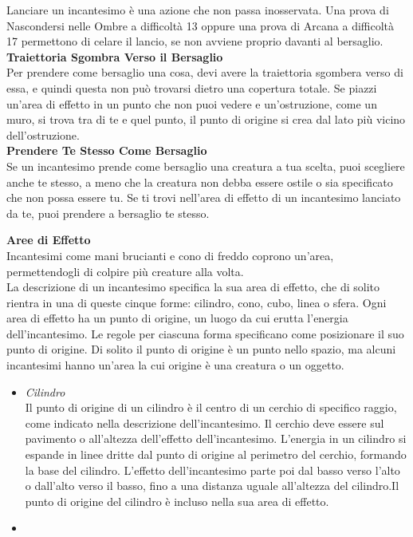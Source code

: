 \begin{multicols}{2}
Lanciare un incantesimo è una azione che non passa inosservata. Una prova di Nascondersi nelle Ombre a difficoltà 13 oppure una prova di Arcana a difficoltà 17 permettono di celare il lancio, se non avviene proprio davanti al bersaglio.\\

\textbf{Traiettoria Sgombra Verso il Bersaglio}\\
Per prendere come bersaglio una cosa, devi avere la traiettoria sgombera verso di essa, e quindi questa non può trovarsi dietro una copertura totale. Se piazzi un'area di effetto in un punto che non puoi vedere e un'ostruzione, come un muro, si trova tra di te e quel punto, il punto di origine si crea dal lato più vicino dell'ostruzione.\\

\textbf{Prendere Te Stesso Come Bersaglio} \\
Se un incantesimo prende come bersaglio una creatura a tua scelta, puoi scegliere anche te stesso, a meno che la creatura non debba essere ostile o sia specificato che non possa essere tu. Se ti trovi nell'area di effetto di un incantesimo lanciato da te, puoi prendere a bersaglio te stesso.\\

\medskip

\textbf{Aree di Effetto}\\
Incantesimi come mani brucianti e cono di freddo coprono un'area, permettendogli di colpire più creature alla volta.\\

La descrizione di un incantesimo specifica la sua area di effetto, che di solito rientra in una di queste cinque forme: cilindro, cono, cubo, linea o sfera. Ogni area di effetto ha un punto di origine, un luogo da cui erutta l'energia dell'incantesimo. Le regole per ciascuna forma specificano come posizionare il suo punto di origine. Di solito il punto di origine è un punto nello spazio, ma alcuni incantesimi hanno un'area la cui origine è una creatura o un oggetto.\\

\begin{itemize}
\item
\textit{Cilindro}\\
Il punto di origine di un cilindro è il centro di un cerchio di specifico raggio, come indicato nella descrizione dell'incantesimo. Il cerchio deve essere sul pavimento o all'altezza dell'effetto dell'incantesimo. L'energia in un cilindro si espande in linee dritte dal punto di origine al perimetro del cerchio, formando la base del cilindro. L'effetto dell'incantesimo parte poi dal basso verso l'alto o dall'alto verso il basso, fino a una distanza uguale all'altezza del cilindro.Il punto di origine del cilindro è incluso nella sua area di effetto.\\
\item


\end{itemize}
\end{multicols}
